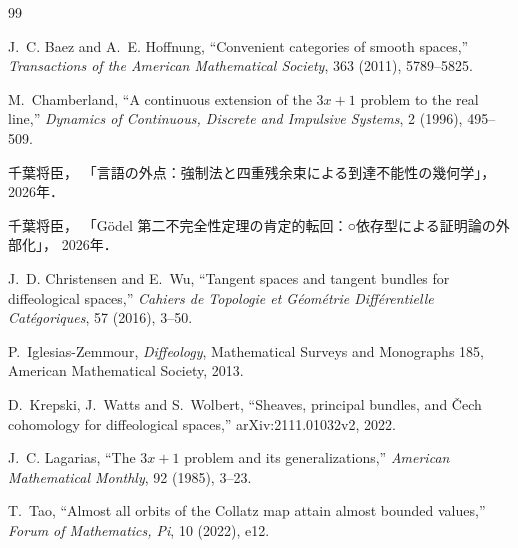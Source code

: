 \documentclass[a4paper,11pt]{ltjsarticle}
\theoremstyle{definition}
\theoremstyle{plain}
\newcommand{\1}{\mathbf{1}}
\begin{document}
\begin{thebibliography}{99}

J.~C. Baez and A.~E. Hoffnung,
``Convenient categories of smooth spaces,''
\emph{Transactions of the American Mathematical Society},
363 (2011), 5789--5825.

M.~Chamberland,
``A continuous extension of the $3x+1$ problem to the real line,''
\emph{Dynamics of Continuous, Discrete and Impulsive Systems},
2 (1996), 495--509.

千葉将臣，
「言語の外点：強制法と四重残余束による到達不能性の幾何学」，2026年．

千葉将臣，
「Gödel 第二不完全性定理の肯定的転回：○依存型による証明論の外部化」，
2026年．

J.~D. Christensen and E.~Wu,
``Tangent spaces and tangent bundles for diffeological spaces,''
\emph{Cahiers de Topologie et Géométrie Différentielle Catégoriques},
57 (2016), 3--50.

P.~Iglesias-Zemmour,
\emph{Diffeology},
Mathematical Surveys and Monographs 185,
American Mathematical Society, 2013.

D.~Krepski, J.~Watts and S.~Wolbert,
``Sheaves, principal bundles, and Čech cohomology for diffeological spaces,''
arXiv:2111.01032v2, 2022.

J.~C. Lagarias,
``The $3x+1$ problem and its generalizations,''
\emph{American Mathematical Monthly}, 92 (1985), 3--23.

T.~Tao,
``Almost all orbits of the Collatz map attain almost bounded values,''
\emph{Forum of Mathematics, Pi}, 10 (2022), e12.

\end{thebibliography}
\end{document}
